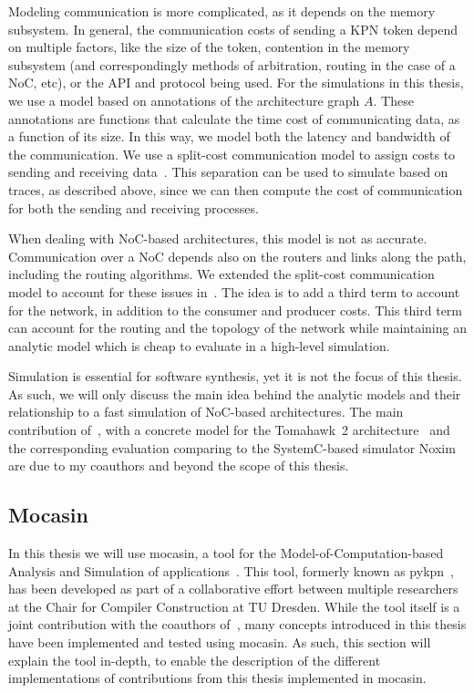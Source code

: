 Modeling communication is more complicated, as it depends on the memory subsystem. In general, the communication costs of sending a KPN token depend on multiple factors, like the size of the token, contention in the memory subsystem (and correspondingly methods of arbitration, routing in the case of a \ac{NoC}, etc), or the API and protocol being used.
For the simulations in this thesis, we use a model based on annotations of the architecture graph $A$. These annotations are functions that calculate the time cost of communicating data, as a function of its size.
In this way, we model both the latency and bandwidth of the communication.
We use a split-cost communication model to assign costs to sending and receiving data~\cite{odendahl2013split}.
This separation can be used to simulate based on traces, as described above, since we can then compute the cost of communication for both the sending and receiving processes.

When dealing with \ac{NoC}-based architectures, this model is not as accurate.
Communication over a \ac{NoC} depends also on the routers and links along the path, including the routing algorithms.
We extended the split-cost communication model to account for these issues in~\cite{menard_norcas16}.
The idea is to add a third term to account for the network, in addition to the consumer and producer costs. 
This third term can account for the routing and the topology of the network while maintaining an analytic model which is cheap to evaluate in a high-level simulation.

Simulation is essential for software synthesis, yet it is not the focus of this thesis. As such, we will only discuss the main idea behind the analytic models and their relationship to a fast simulation of \ac{NoC}-based architectures.
The main contribution of~\cite{menard_norcas16}, with a concrete model for the Tomahawk~2 architecture~\cite{tomahawk2} and the corresponding evaluation comparing to the SystemC-based simulator Noxim~\cite{noxim} are due to my coauthors and beyond the scope of this thesis.

\subsection{Mocasin}

In this thesis we will use mocasin, a tool for the Model-of-Computation-based Analysis and Simulation of applications~\cite{menard_rapido21}.
This tool, formerly known as pykpn~\cite{goens_mcsoc18}, has been developed as part of a collaborative effort between multiple researchers at the Chair for Compiler Construction at TU Dresden.
While the tool itself is a joint contribution with the coauthors of~\cite{menard_rapido21}, many concepts introduced in this thesis have been implemented and tested using mocasin.
As such, this section will explain the tool in-depth, to enable the description of the different implementations of contributions from this thesis implemented in mocasin.

